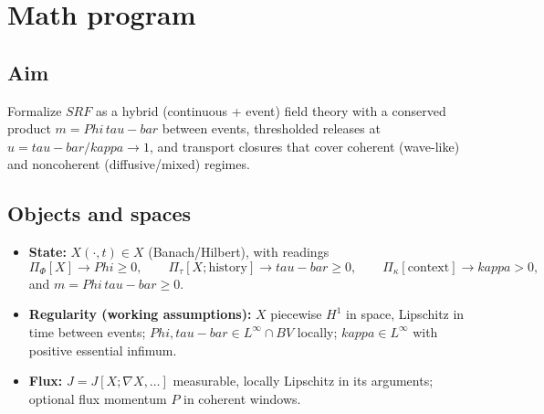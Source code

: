 \documentclass[12pt]{article}
\newcommand{\FoldDensity}{\Phi}
\newcommand{\FoldTime}{\bar{\tau}}
\newcommand{\Threshold}{\kappa}
\newcommand{\SRF}{\mathcal{F}_{\mathrm{SR}}}
\def\FoldDensity{Phi}%
\def\FoldTime{tau-bar}%
\def\Threshold{kappa}%
\def\SRF{SRF}%
\def\bar#1{#1}%
\def\mathcal#1{#1}%
\def\mathrm#1{#1}%
\begin{document}

\section{Math program}

\subsection{Aim}
Formalize $\SRF$ as a hybrid (continuous + event) field theory with a conserved product $m=\FoldDensity\,\FoldTime$ between events, thresholded releases at $u=\FoldTime/\Threshold \to 1$, and transport closures that cover coherent (wave-like) and noncoherent (diffusive/mixed) regimes.

\subsection{Objects and spaces}
\begin{itemize}
  \item \textbf{State:} $X(\cdot,t)\in\mathcal{X}$ (Banach/Hilbert), with readings
  \[
  \Pi_\Phi[X]\to \FoldDensity\ge 0,\qquad
  \Pi_{\bar\tau}[X;\text{history}]\to \FoldTime\ge 0,\qquad
  \Pi_\kappa[\text{context}]\to \Threshold>0,
  \]
  and $m=\FoldDensity\,\FoldTime\ge 0$.
  \item \textbf{Regularity (working assumptions):} $X$ piecewise $H^1$ in space, Lipschitz in time between events; $\FoldDensity,\FoldTime\in L^\infty\cap BV$ locally; $\Threshold\in L^\infty$ with positive essential infimum.
  \item \textbf{Flux:} $J=J[X;\nabla X,\ldots]$ measurable, locally Lipschitz in its arguments; optional flux momentum $P$ in coherent windows.
\end{itemize}
\end{document}
